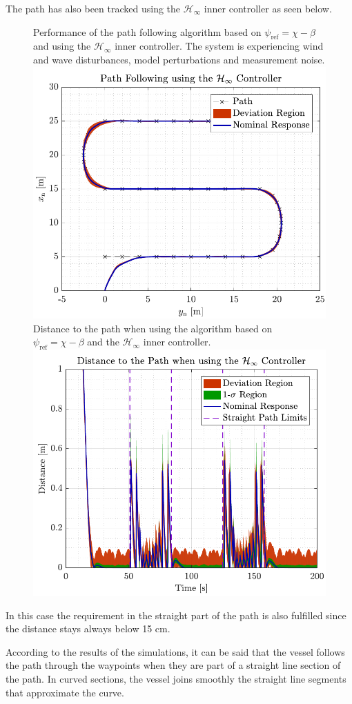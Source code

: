 The path has also been tracked using the $\mathcal{H}_\infty$ inner controller as seen below.
\begin{figure}[H]
    \captionbox 
    {   
        Performance of the path following algorithm based on $\psi_\mathrm{ref}=\chi-\beta$ and using the $\mathcal{H}_\infty$ inner controller. The system is experiencing wind and wave disturbances, model perturbations and measurement noise. \label{fig:path_rob2}
    }                                                                 
    {                                                                  
        \includegraphics[width=.45\textwidth]{figures/path_rob}         
    }                                                                    
    \hspace{5pt}                                                          
    \captionbox  
    {      
        Distance to the path when using the algorithm based on $\psi_\mathrm{ref}=\chi-\beta$ and the $\mathcal{H}_\infty$ inner controller. \label{fig:dist_rob2}
    }                                                                          
    {
        \includegraphics[width=.45\textwidth]{figures/dist_rob}
    }
\end{figure}
In this case the requirement in the straight part of the path is also fulfilled since the distance stays always below 15 cm.

According to the results of the simulations, it can be said that the vessel follows the path through the waypoints when they are part of a straight line section of the path. In curved sections, the vessel joins smoothly the straight line segments that approximate the curve. 

